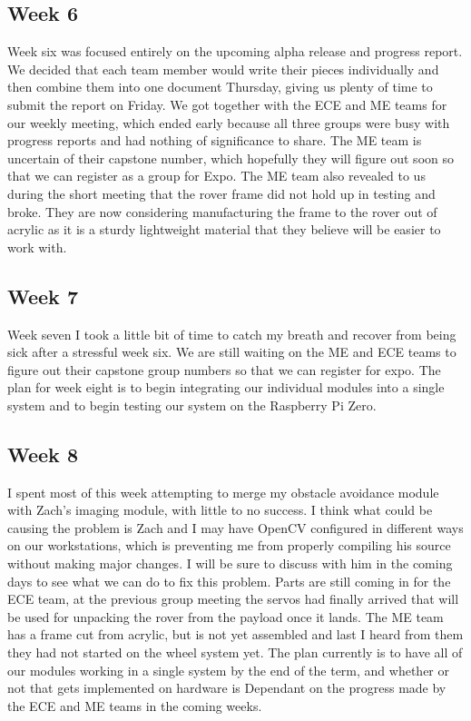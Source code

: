 \documentclass[10pt,letterpaper,onecolumn,draftclsnofoot,journal]{IEEEtran}
\begin{document}
\subsection{Week 6}
Week six was focused entirely on the upcoming alpha release and progress report. We decided that each team member would write their pieces individually and then combine them into one document Thursday, giving us plenty of time to submit the report on Friday. We got together with the ECE and ME teams for our weekly meeting, which ended early because all three groups were busy with progress reports and had nothing of significance to share. The ME team is uncertain of their capstone number, which hopefully they will figure out soon so that we can register as a group for Expo. The ME team also revealed to us during the short meeting that the rover frame did not hold up in testing and broke. They are now considering manufacturing the frame to the rover out of acrylic as it is a sturdy lightweight material that they believe will be easier to work with.

\subsection{Week 7}
Week seven I took a little bit of time to catch my breath and recover from being sick after a stressful week six. We are still waiting on the ME and ECE teams to figure out their capstone group numbers so that we can register for expo. The plan for week eight is to begin integrating our individual modules into a single system and to begin testing our system on the Raspberry Pi Zero.

\subsection{Week 8}
I spent most of this week attempting to merge my obstacle avoidance module with Zach's imaging module, with little to no success. I think what could be causing the problem is Zach and I may have OpenCV configured in different ways on our workstations, which is preventing me from properly compiling his source without making major changes. I will be sure to discuss with him in the coming days to see what we can do to fix this problem. Parts are still coming in for the ECE team, at the previous group meeting the servos had finally arrived that will be used for unpacking the rover from the payload once it lands. The ME team has a frame cut from acrylic, but is not yet assembled and last I heard from them they had not started on the wheel system yet. The plan currently is to have all of our modules working in a single system by the end of the term, and whether or not that gets implemented on hardware is Dependant on the progress made by the ECE and ME teams in the coming weeks.
\end{document}
